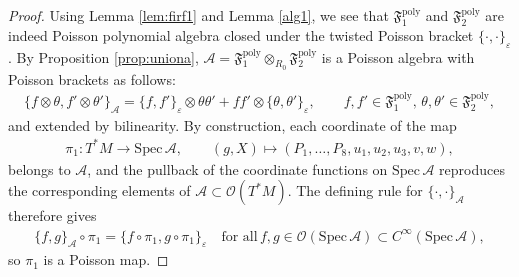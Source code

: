 \documentclass[11pt]{amsart}
\theoremstyle{definition}
\theoremstyle{plain}
\theoremstyle{conclusion}
\begin{document}
 
\begin{proof}
Using Lemma \ref{lem:firf1} and Lemma \ref{alg1}, we see that $\mathfrak{F}_1^{\mathrm{poly}}$ and $\mathfrak{F}_2^{\mathrm{poly}}$ are indeed Poisson polynomial algebra closed under the twisted Poisson bracket $\{\cdot,\cdot\}_\varepsilon$. By Proposition \ref{prop:uniona}, $\mathcal{A}=\mathfrak{F}_1^{\mathrm{poly}}\otimes_{R_0}\mathfrak{F}_2^{\mathrm{poly}}$ is a Poisson algebra with Poisson brackets as follows:
\begin{align*}
\{f\otimes \theta,f'\otimes \theta'\}_{\mathcal{A}}=\{f,f'\}_\varepsilon\otimes \theta\theta' +  ff'\otimes\{\theta,\theta'\}_\varepsilon,\qquad f,f'\in\mathfrak{F}_1^{\mathrm{poly}},\,\theta,\theta'\in\mathfrak{F}_2^{\mathrm{poly}},
\end{align*} and extended by bilinearity. By construction, each coordinate of the map \begin{align*}
\pi_1:T^*M\to\mathrm{Spec}\,\mathcal{A},\qquad(g,X)\mapsto(P_1,\ldots,P_8,u_1,u_2,u_3,v,w),
\end{align*} belongs to $\mathcal{A}$, and the pullback of the coordinate functions on $\mathrm{Spec}\,\mathcal{A}$ reproduces the corresponding elements of $\mathcal{A}\subset \mathcal{O}(T^*M)$. The defining rule for $\{\cdot,\cdot\}_{\mathcal{A}}$ therefore gives\begin{align*}
\{f,g\}_{\mathcal{A}}\circ\pi_1=\{f\circ\pi_1,g\circ\pi_1\}_\varepsilon \quad\text{for all}\,f,g\in \mathcal{O}(\mathrm{Spec}\,\mathcal{A}) \subset C^\infty(\mathrm{Spec}\, \mathcal{A}),
\end{align*}so $\pi_1$ is a Poisson map.


\end{proof}
\end{document}
